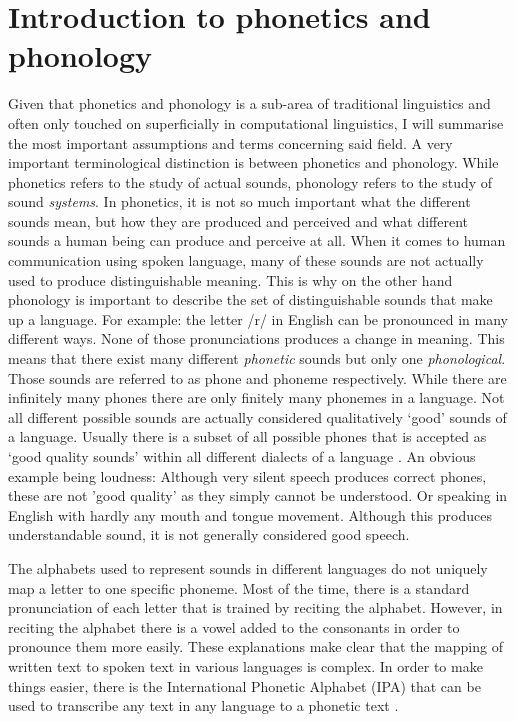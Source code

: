 \section{Introduction to phonetics and phonology}
Given that phonetics and phonology is a sub-area of traditional linguistics and often only touched on superficially in computational linguistics, I will summarise the most important assumptions and terms concerning said field. A very important terminological distinction is between phonetics and phonology. While phonetics refers to the study of actual sounds, phonology refers to the study of sound \textit{systems}. In phonetics, it is not so much important what the different sounds mean, but how they are produced and perceived and what different sounds a human being can produce and perceive at all. When it comes to human communication using spoken language, many of these sounds are not actually used to produce distinguishable meaning. This is why on the other hand phonology is important to describe the set of distinguishable sounds that make up a language. For example: the letter /r/ in English can be pronounced in many different ways. None of those pronunciations produces a change in meaning. This means that there exist many different \textit{phonetic} sounds but only one \textit{phonological}. Those sounds are referred to as phone and phoneme respectively. While there are infinitely many phones there are only finitely many phonemes in a language. Not all different possible sounds are actually considered qualitatively `good' sounds of a language. Usually there is a subset of all possible phones that is accepted as `good quality sounds' within all different dialects of a language \citep{Intro.2007}. An obvious example being loudness: Although very silent speech produces correct phones, these are not 'good quality' as they simply cannot be understood. Or speaking in English with hardly any mouth and tongue movement. Although this produces understandable sound, it is not generally considered good speech. 

The alphabets used to represent sounds in different languages do not uniquely map a letter to one specific phoneme. Most of the time, there is a standard pronunciation of each letter that is trained by reciting the alphabet. However, in reciting the alphabet there is a vowel added to the consonants in order to pronounce them more easily. These explanations make clear that the mapping of written text to spoken text in various languages is complex. In order to make things easier, there is the International Phonetic Alphabet (IPA) that can be used to transcribe any text in any language to a phonetic text \citep{Intro.2007}. 

